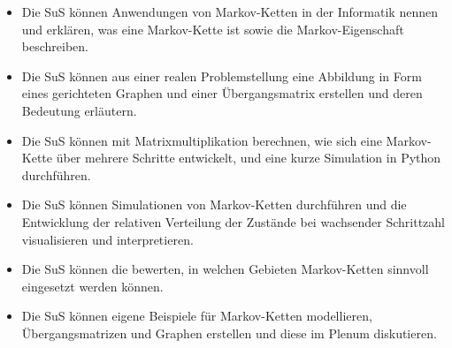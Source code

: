 \begin{itemize}
    \item[\textbf{Wissen}] Die SuS können Anwendungen von Markov-Ketten in der Informatik nennen und erklären, was eine Markov-Kette ist sowie die Markov-Eigenschaft beschreiben.
    \item[\textbf{Verstehen}] Die SuS können aus einer realen Problemstellung eine Abbildung in Form eines gerichteten Graphen und einer Übergangsmatrix erstellen und deren Bedeutung erläutern.
    \item[\textbf{Anwenden}] Die SuS können mit Matrixmultiplikation berechnen, wie sich eine Markov-Kette über mehrere Schritte entwickelt, und eine kurze Simulation in Python durchführen.
    \item[\textbf{Analysieren}] Die SuS können Simulationen von Markov-Ketten durchführen und die Entwicklung der relativen Verteilung der Zustände bei wachsender Schrittzahl visualisieren und interpretieren.
    \item[\textbf{Bewerten}] Die SuS können die bewerten, in welchen Gebieten Markov-Ketten sinnvoll eingesetzt werden können.
    \item[\textbf{Entwickeln}] Die SuS können eigene Beispiele für Markov-Ketten modellieren, Übergangsmatrizen und Graphen erstellen und diese im Plenum diskutieren.
\end{itemize}


